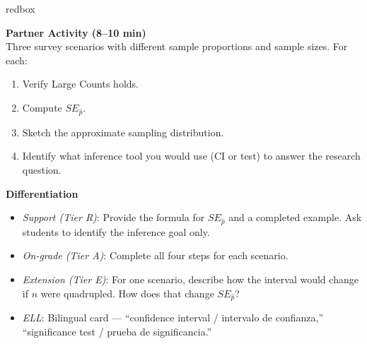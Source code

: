 \documentclass[10pt]{article}
\begin{document}
\begin{skillbox}{redbox}
\begin{minipage}[t]{0.48\linewidth}
    \textbf{Partner Activity (8--10 min)}\\
    Three survey scenarios with different sample proportions and sample sizes.
    For each:
    \begin{enumerate}
        \item Verify Large Counts holds.
        \item Compute $SE_{\hat p}$.
        \item Sketch the approximate sampling distribution.
        \item Identify what inference tool you would use (CI or test) to answer
              the research question.
    \end{enumerate}
\end{minipage}
\hfill
\begin{minipage}[t]{0.48\linewidth}
    \textbf{Differentiation}
    \begin{itemize}
        \item \textit{Support (Tier R)}: Provide the formula for $SE_{\hat p}$ and a
              completed example. Ask students to identify the inference goal only.
        \item \textit{On-grade (Tier A)}: Complete all four steps for each scenario.
        \item \textit{Extension (Tier E)}: For one scenario, describe how the interval
              would change if $n$ were quadrupled. How does that change $SE_{\hat p}$?
        \item \textit{ELL}: Bilingual card --- ``confidence interval / intervalo de confianza,''
              ``significance test / prueba de significancia.''
    \end{itemize}
\end{minipage}
\end{skillbox}
\end{document}
